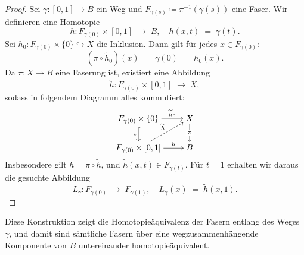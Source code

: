 \documentclass[12pt]{article}
\numberwithin{conj}{section}
\begin{document}
    \begin{proof}
        Sei $\gamma : [0,1] \to B$ ein Weg und $F_{\gamma(s)}\coloneqq \pi^{-1}(\gamma
        (s))$ eine Faser. Wir definieren eine Homotopie
        \[
            h : F_{\gamma(0)}\times [0,1] \;\longrightarrow\; B, \quad h(x,t) \;=\; \gamma
            (t).
        \]
        Sei $\widetilde{h}_{0} : F_{\gamma(0)}\times \{0\} \hookrightarrow X$ die
        Inklusion. Dann gilt für jedes $x \in F_{\gamma(0)}$:
        \[
            (\pi \circ \widetilde{h}_{0})(x) \;=\; \gamma(0) \;=\; h_{0}(x).
        \]
        Da $\pi : X \to B$ eine Faserung ist, existiert eine Abbildung
        \[
            \widetilde{h}: F_{\gamma(0)}\times [0,1] \;\longrightarrow\; X,
        \]
        sodass in folgendem Diagramm alles kommutiert:
        \[
            \begin{tikzcd}
                [cramped] {F_{\gamma(0)}\times\{0\}} & X \\ {F_{\gamma(0)}\times[0,1]} &
                B \arrow["{\widetilde{h}_0}", from=1-1, to=1-2] \arrow["\iota"', hook, from=1-1,
                to=2-1] \arrow["\pi"{description}, from=1-2, to=2-2] \arrow["{\widetilde{h}}",
                dashed, from=2-1, to=1-2] \arrow["h", from=2-1, to=2-2]
            \end{tikzcd}
        \]
        Insbesondere gilt $h = \pi \circ \widetilde{h}$, und $\widetilde{h}(x,t) \in F_{\gamma(t)}$.
        Für $t=1$ erhalten wir daraus die gesuchte Abbildung
        \[
            L_{\gamma} : F_{\gamma(0)}\;\longrightarrow\; F_{\gamma(1)}, \quad L_{\gamma}
            (x) \;=\; \widetilde{h}(x,1).
        \]
    \end{proof}
    Diese Konstruktion zeigt die Homotopieäquivalenz der Fasern entlang des Weges $\gamma$, und damit sind sämtliche Fasern über eine wegzusammenhängende Komponente von $B$ untereinander homotopieäquivalent.
\end{document}
